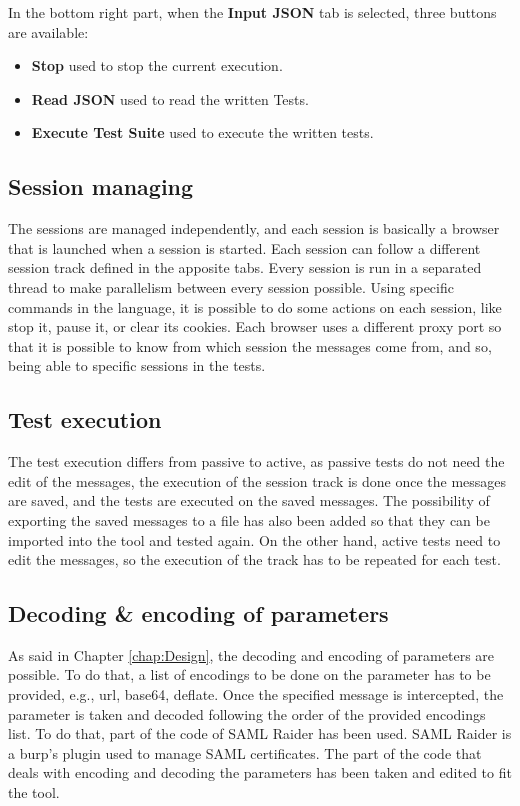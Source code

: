 In the bottom right part, when the \textbf{Input JSON} tab is selected, three buttons are available:
\begin{itemize}
    \item \textbf{Stop} used to stop the current execution.
    \item \textbf{Read JSON} used to read the written Tests.
    \item \textbf{Execute Test Suite} used to execute the written tests.
\end{itemize}

\subsection{Session managing}
The sessions are managed independently, and each session is basically a browser that is launched when a session is started. Each session can follow a different \gls{session track} defined in the apposite tabs. Every session is run in a separated thread to make parallelism between every session possible. Using specific commands in the language, it is possible to do some actions on each session, like stop it, pause it, or clear its cookies. Each browser uses a different proxy port so that it is possible to know from which session the messages come from, and so, being able to specific sessions in the tests.

\subsection{Test execution}
The test execution differs from passive to active, as passive tests do not need the edit of the messages, the execution of the \gls{session track} is done once the messages are saved, and the tests are executed on the saved messages. The possibility of exporting the saved messages to a file has also been added so that they can be imported into the tool and tested again.
On the other hand, active tests need to edit the messages, so the execution of the track has to be repeated for each test.

\subsection{Decoding \& encoding of parameters}
As said in Chapter \ref{chap:Design}, the decoding and encoding of parameters are possible. To do that, a list of encodings to be done on the parameter has to be provided, e.g., url, base64, deflate. Once the specified message is intercepted, the parameter is taken and decoded following the order of the provided encodings list. To do that, part of the code of SAML Raider \cite{saml_raider} has been used. SAML Raider is a \Gls{burp}'s plugin used to manage \Gls{SAML} certificates. The part of the code that deals with encoding and decoding the parameters has been taken and edited to fit the tool.

